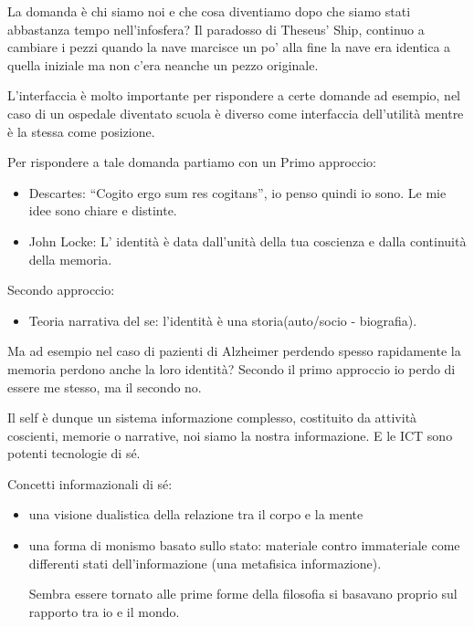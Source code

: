 \documentclass[a4page, 11pt]{article}
\begin{document}
La domanda è chi siamo noi e che cosa diventiamo dopo che siamo stati
abbastanza tempo nell'infosfera? Il paradosso di Theseus' Ship, continuo
a cambiare i pezzi quando la nave marcisce un po' alla fine la nave era
identica a quella iniziale ma non c'era neanche un pezzo originale.

L'interfaccia è molto importante per rispondere a certe domande ad
esempio, nel caso di un ospedale diventato scuola è diverso come
interfaccia dell'utilità mentre è la stessa come posizione.

Per rispondere a tale domanda partiamo con un Primo approccio:

\begin{itemize}
	 
	\item
	Descartes: ``Cogito ergo sum res cogitans'', io penso quindi io sono.
	Le mie idee sono chiare e distinte.
	\item
	John Locke: L' identità è data dall'unità della tua coscienza e dalla
	continuità della memoria.
\end{itemize}

Secondo approccio:

\begin{itemize}
	 
	\item
	Teoria narrativa del se: l'identità è una storia(auto/socio - biografia).
\end{itemize}

Ma ad esempio nel caso di pazienti di Alzheimer perdendo spesso
rapidamente la memoria perdono anche la loro identità? Secondo il primo
approccio io perdo di essere me stesso, ma il secondo no.

Il self è dunque un sistema informazione complesso, costituito da
attività coscienti, memorie o narrative, noi siamo la nostra
informazione. E le ICT sono potenti tecnologie di sé.

Concetti informazionali di sé:

\begin{itemize}
	\item
	una visione dualistica della relazione tra il corpo e la mente
	\item
	una forma di monismo basato sullo stato: materiale contro immateriale
	come differenti stati dell'informazione (una metafisica informazione).
	
	Sembra essere tornato alle prime forme della filosofia si basavano
	proprio sul rapporto tra io e il mondo.
\end{itemize}
\end{document}
